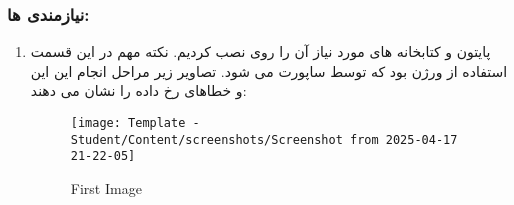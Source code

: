 \subsubsection*{نیازمندی ها:}
\begin{enumerate}
    \item پایتون و کتابخانه های مورد نیاز آن را روی  نصب کردیم. نکته مهم در این قسمت استفاده از ورژن  بود که توسط  ساپورت می شود.
    تصاویر زیر مراحل انجام این این و خطاهای رخ داده را نشان می دهند:
    \begin{figure}[htbp]
      \centering
      \texttt{[image: Template - Student/Content/screenshots/Screenshot from 2025-04-17 21-22-05]}
      \caption{First Image}
      \label{fig:vert1}
    \end{figure}
    

\end{enumerate}
